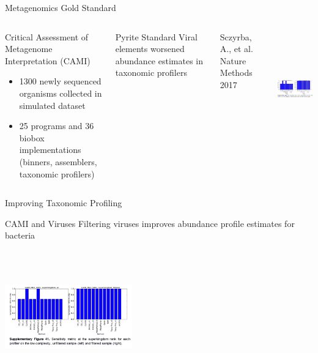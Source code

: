 \documentclass[11pt]{beamer}
\begin{document}
	
	\begin{frame}{Metagenomics Gold Standard} 
	\begin{columns}
	\begin{block}{Critical Assessment of Metagenome Interpretation (CAMI)}
	\begin{itemize}
	\item 1300 newly sequenced organisms collected in simulated dataset 
	\item 25 programs and 36 biobox implementations (binners, assemblers, taxonomic profilers)
	\end{itemize}
	\end{block}
	
	\begin{block}{Pyrite Standard}
	Viral elements worsened abundance estimates in taxonomic profilers
	\end{block}
	
	\vspace{0.3cm}
	\tiny{Sczyrba, A., et al. Nature Methods 2017}
	
	
	\includegraphics[height=5cm, width=5.5cm]{filtered.png}
	\end{columns}
	
	\end{frame}
	
	
	\begin{frame}{Improving Taxonomic Profiling}
	
	
	\begin{block}{CAMI and Viruses}
	Filtering viruses improves abundance profile estimates for bacteria
	\end{block}
	\vspace{0.1cm}
	\begin{columns}
	\column{0.5\textwidth}
	\includegraphics[height=5cm, width=5.5cm]{filtered.png}
	\end{columns}
	
	\end{frame}
	
\end{document}
